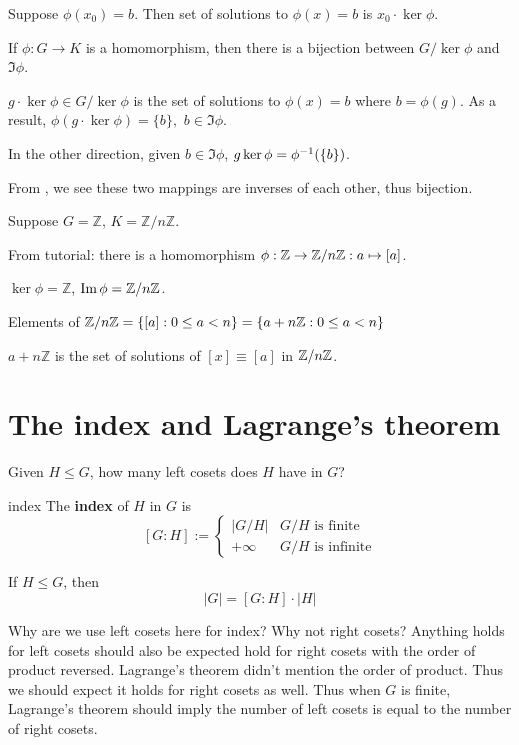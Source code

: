 \begin{lemma}
Suppose $\phi(x_0)=b$. Then set of solutions to $\phi(x)=b$ is $x_0\cdot \ker\phi$.
\end{lemma}

\begin{prop}
If $\phi:G\to K$ is a homomorphism, then there is a bijection between $G/\ker\phi$ and $\Im\phi$.
\end{prop}

\begin{pf}
$g\cdot \ker\phi\in G/\ker\phi$ is the set of solutions to $\phi(x)=b$ where $b=\phi(g)$. As a result, $\phi(g\cdot \ker\phi)=\{b\},$ $b\in \Im\phi$.

In the other direction, given $b\in\Im\phi$, $g\ker\phi = \phi^{-1}(\{b\})$.

From , we see these two mappings are inverses of each other, thus bijection.
\end{pf}

\begin{ex}
Suppose $G=\mathbb Z$, $K=\mathbb Z/n\mathbb Z$.

From tutorial: there is a homomorphism $\phi:\mathbb Z\to \mathbb Z/n\mathbb Z:a\mapsto [a]$.

$\ker \phi = \mathbb Z$, $\operatorname{Im}\phi = \mathbb Z/n\mathbb Z$.

Elements of $\mathbb Z/n\mathbb Z = \{[a]:0\le a < n\}=\{a+n\mathbb Z:0\le a <n\}$

$a+n\mathbb Z$ is the set of solutions of $[x]\equiv[a]$ in $\mathbb Z/n\mathbb Z$.
\end{ex}

\section{The index and Lagrange's theorem}
Given $H\le G$, how many left cosets does $H$ have in $G$?

\begin{defn}{index}
The \textbf{index} of $H$ in $G$ is 
$$
[G:H] :=\begin{cases}
|G/H| & G/H \text{ is finite}\\
+\infty & G/H \text{ is infinite}
\end{cases}
$$
\end{defn}
\begin{thm}
	If $H\le G$, then
	$$|G|=[G:H]\cdot |H|$$
\end{thm}

\begin{remark}
Why are we use left cosets here for index? Why not right cosets? Anything holds for left cosets should also be expected hold for right cosets with the order of product  reversed. Lagrange's theorem didn't mention the order of product. Thus we should expect it holds for right cosets as well. Thus when $G$ is finite, Lagrange's theorem should imply the number of left cosets is equal to the number of right cosets.
\end{remark}

